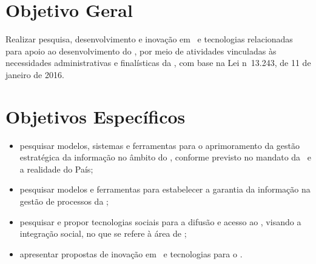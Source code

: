 
\section{Objetivo Geral}\label{sec:objetivo_geral}

Realizar pesquisa, desenvolvimento e inovação em \ai\ e tecnologias relacionadas para apoio ao desenvolvimento do \PEB, por meio de atividades vinculadas às necessidades administrativas e finalísticas da \siglacntrt, com base na Lei n\ele\ 13.243, de 11 de janeiro de 2016.


\section{Objetivos Específicos}\label{sec:objetivos_especificos}

\begin{itemize}
    \item pesquisar modelos, sistemas e ferramentas para o aprimoramento da gestão estratégica da informação no âmbito do \PEB, conforme previsto no mandato da \siglacntrt\ e a realidade do País;
    
    \item pesquisar modelos e ferramentas para estabelecer a garantia da informação na gestão de processos da \siglacntrt;
    
    \item pesquisar e propor tecnologias sociais para a difusão e acesso ao \PEB, visando a integração social, no que se refere à área de \ai;
    
    \item apresentar propostas de inovação em \ai\ e tecnologias para o \PEB.
    
%  
%  
%  
%  
%  
%  
\end{itemize}

